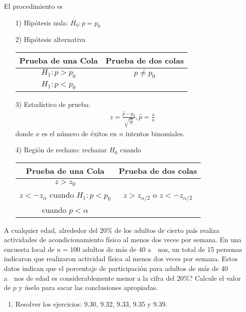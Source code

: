 \begin{frame}
\begin{frame}
El procedimiento es
\begin{itemize}
\item[1) ] Hip\'otesis nula: $H_{0}:p=p_{0}$
\item[2) ] Hip\'otesis alternativa
\begin{tabular}{cc}\hline
\textbf{Prueba de una Cola} & \textbf{Prueba de dos colas}\\\hline
$H_{1}:p>p_{0}$ & $p\neq p_{0}$\\
$H_{1}:p<p_{0}$ & \\
\end{tabular}
\item[3) ] Estad\'istico de prueba:
\begin{eqnarray*}
z=\frac{\hat{p}-p_{0}}{\sqrt{\frac{pq}{n}}},\hat{p}=\frac{x}{n}
\end{eqnarray*}
donde $x$ es el n\'umero de \'exitos en $n$ intentos binomiales.

\end{itemize}



\begin{itemize}
\item[4) ] Regi\'on de rechazo: rechazar $H_{0}$ cuando
\begin{tabular}{cc}\hline
\textbf{Prueba de una Cola} & \textbf{Prueba de dos colas}\\\hline
$z>z_{0}$ & \\
$z<-z_{\alpha}$ cuando $H_{1}:p<p_{0}$&$z>z_{\alpha/2}$ o $z<-z_{\alpha/2}$\\
 cuando $p<\alpha$&\\
\end{tabular}
\end{itemize}



\begin{Ejem}
A cualquier edad, alrededor del $20\%$ de los adultos de cierto pa\'is realiza actividades de acondicionamiento f\'isico al menos dos veces por semana. En una encuesta local de $n=100$ adultos de m\'as de $40$ a\ ~nos, un total de 15 personas indicaron que realizaron actividad f\'isica al menos dos veces por semana. Estos datos indican que el porcentaje de participaci\'on para adultos de m\'as de 40 a\ ~nos de edad es  considerablemente menor a la cifra del $20\%$? Calcule el valor de $p$ y \'uselo para sacar las conclusiones apropiadas.
\end{Ejem}

\begin{enumerate}
\item Resolver los ejercicios: 9.30, 9.32, 9.33, 9.35 y 9.39.
\end{enumerate}




\end{frame}
\end{frame}
